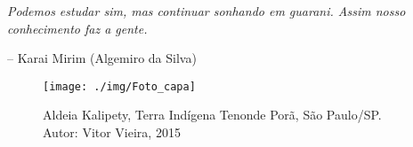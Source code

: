 
\vspace*{\fill}

\epigraph{\emph{Podemos estudar sim, mas continuar sonhando em guarani. Assim nosso conhecimento faz a gente.}}{-- Karai Mirim (Algemiro da Silva)}

\thispagestyle{empty}

\pagebreak

\vspace*{\fill}

\begin{figure}[H]
\centering
  \texttt{[image: ./img/Foto\_capa]}
\caption{Aldeia Kalipety, Terra Indígena Tenonde Porã, São Paulo/SP. Autor: Vitor Vieira, 2015}
\end{figure}

\vspace*{\fill}

\thispagestyle{empty}